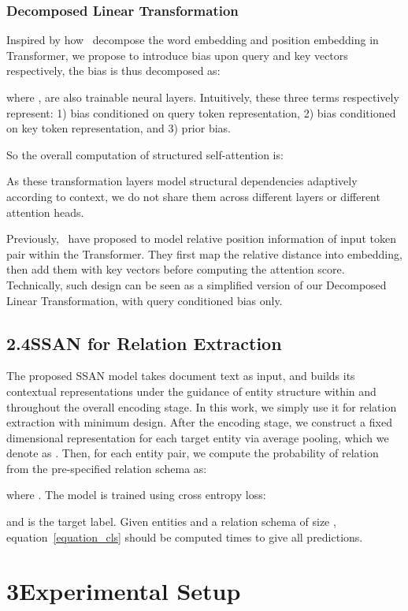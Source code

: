 \documentclass[letterpaper]{article} \usepackage{aaai21}  \usepackage{times}  \usepackage{helvet} \usepackage{courier}  \usepackage[hyphens]{url}  \usepackage{graphicx} \usepackage{booktabs}
\begin{document}
\subsubsection{Decomposed Linear Transformation}
Inspired by how~\citet{dai-etal-2019-transformer} decompose the word embedding and position embedding in Transformer, we propose to introduce bias upon query and key vectors respectively, the bias is thus decomposed as:

where , are also trainable neural layers.
Intuitively, these three terms respectively represent: 1) bias conditioned on query token representation, 2) bias conditioned on key token representation, and 3) prior bias.

So the overall computation of structured self-attention is:

As these transformation layers model structural dependencies adaptively according to context, we do not share them across different layers or different attention heads.

Previously,~\citet{shaw-etal-2018-self} have proposed to model relative position information of input token pair within the Transformer.
They first map the relative distance into embedding, then add them with key vectors before computing the attention score.
Technically, such design can be seen as a simplified version of our Decomposed Linear Transformation, with query conditioned bias only.

\subsection{2.4\quad SSAN for Relation Extraction}\label{2.3:Relation Extraction}
The proposed SSAN model takes document text as input, and builds its contextual representations under the guidance of entity structure within and throughout the overall encoding stage.
In this work, we simply use it for relation extraction with minimum design.
After the encoding stage, we construct a fixed dimensional representation for each target entity via average pooling, which we denote as .
Then, for each entity pair, we compute the probability of relation  from the pre-specified relation schema as:

where .
The model is trained using cross entropy loss:

and  is the target label.
Given  entities and a relation schema of size , equation~\ref{equation_cls} should be computed  times to give all predictions.


\section{3\quad Experimental Setup}
\end{document}
